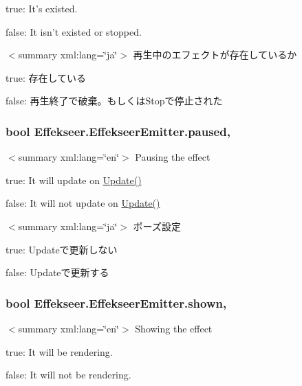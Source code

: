 true\-: It's existed.

false\-: It isn't existed or stopped.

$<$summary xml\-:lang=\char`\"{}ja\char`\"{}$>$ 再生中のエフェクトが存在しているか 

true\-: 存在している

false\-: 再生終了で破棄。もしくは\-Stopで停止された\hypertarget{class_effekseer_1_1_effekseer_emitter_a82833cae53fe0dcb97fe711aae550fd0}{
\subsubsection[{paused}]{\setlength{\rightskip}{0pt plus 5cm}bool Effekseer.\-Effekseer\-Emitter.\-paused\hspace{0.3cm}{\ttfamily [get]}, {\ttfamily [set]}}}\label{class_effekseer_1_1_effekseer_emitter_a82833cae53fe0dcb97fe711aae550fd0}
$<$summary xml\-:lang=\char`\"{}en\char`\"{}$>$ Pausing the effect 

true\-: It will update on \hyperlink{class_effekseer_1_1_effekseer_emitter_af1bb2b07842a6e671d3c938e4e5ddc28}{Update()}

false\-: It will not update on \hyperlink{class_effekseer_1_1_effekseer_emitter_af1bb2b07842a6e671d3c938e4e5ddc28}{Update()}

$<$summary xml\-:lang=\char`\"{}ja\char`\"{}$>$ ポーズ設定 

true\-: Updateで更新しない

false\-: Updateで更新する\hypertarget{class_effekseer_1_1_effekseer_emitter_af1aadf706ac894eb55fc3cfbf9382294}{
\subsubsection[{shown}]{\setlength{\rightskip}{0pt plus 5cm}bool Effekseer.\-Effekseer\-Emitter.\-shown\hspace{0.3cm}{\ttfamily [get]}, {\ttfamily [set]}}}\label{class_effekseer_1_1_effekseer_emitter_af1aadf706ac894eb55fc3cfbf9382294}
$<$summary xml\-:lang=\char`\"{}en\char`\"{}$>$ Showing the effect 

true\-: It will be rendering.

false\-: It will not be rendering.

